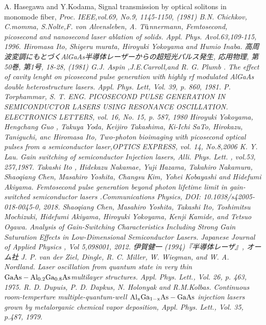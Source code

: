 \begin{thebibliography}{99}
 A. Hasegawa and Y.Kodama, Signal transmission by optical solitons in monomode fiber, \sl Proc. IEEE\rm ,vol.69, No.9, 1145-1150, (1981)
 B.N. Chichkov, C.momma, S.Nolte,F. von Alvensleben, A. T$\rm{\ddot{u}}$nnermann, Femtosecond, picosecond and nanosecond laser ablation of solids. \sl Appl. Phys. A\rm vol.63,109-115, 1996.
 Hiromasa Ito, Shigeru 
murata, Hiroyuki Yokoyama and Humio Inaba. 高周波変調にもとづくAlGaAs半導体レーザーからの超短光パルス発生, 応用物理, 第50巻, 第1号, 18-28, (1981)
 G.J. Aspin ,J.E.Carroll,and R. G. Plumb . The effect of cavity lenght on picosecond pulse generation with highly rf modulated AlGaAs double heterostructure lasers. \sl Appl. Phys. Lett\rm , Vol. 39, p. 860, 1981.
 P. Torphammar, S. T. ENG. PICOSECOND PULSE GENERATION IN SEMICONDUCTOR LASERS USING RESONANCE OSCILLATION. \sl ELECTRONICS LETTERS\rm , vol. 16, No. 15, p. 587, 1980 
 Hiroyuki Yokoyama, Hengchang Guo , Takuya Yoda, Keijiro Takashima, Ki-Ichi SaTo, Hirokazu, Taniguchi, anc Hiromasa Ito, Two-photon bioimaging with picosecond optical pulses from a semiconductor laser,\sl OPTICS EXPRESS\rm , vol. 14, No.8,2006
 K. Y. Lau. Gain switching of semiconductor Injection lasers, \sl Alli. Phys. Lett. \rm , vol.53, 257,1987.
Takashi Ito
, Hidekazu Nakamae, Yuji Hazama, Takahiro Nakamura, Shaoqiang Chen, Masahiro Yoshita, Changsu Kim, Yohei Kobayashi and Hidefumi Akiyama.
Femtosecond pulse generation beyond photon lifetime limit in gain-switched semiconductor lasers .\sl Communications Physics\rm , DOI: 10.1038/s42005-018-0045-0, 2018. 
 Shaoqiang Chen, Masahiro Yoshita, Takashi Ito, Toshimitsu Mochizuki, Hidefumi Akiyama, Hiroyuki Yokoyama, Kenji Kamide, and Tetsuo Ogawa. Analysis of Gain-Switching Characteristics Including Strong Gain Saturation Effects in Low-Dimensional Semiconductor Lasers. \sl Japanese Journal of Applied  Physics \rm , Vol 5,098001, 2012.
 伊賀健一 (1994)『半導体レーザ』, オーム社
 J. P. van der Ziel, Dingle, R. C. Miller, W. Wiegman, and W. A. Nordland. Laser oscillation from quantum state in very thin $\rm{GaAs-Al_{0.2}Ga_{0.8}As }$multilayer structures. \sl Appl. Phys. Lett.\rm , Vol. 26,  p. 463, 1975. 
 R. D. Dupuis, P. D. Dapkus, N. Holonyak and R.M.Kolbas. Continuous room-temperture multiple-quantum-well $\rm{Al_{x}Ga_{1-x}As-GaAs}$ injection lasers grown by metalorganic chemical vapor deposition, \sl  Appl. Phys. Lett.\rm , Vol. 35, p.487, 1979.

\end{thebibliography}
